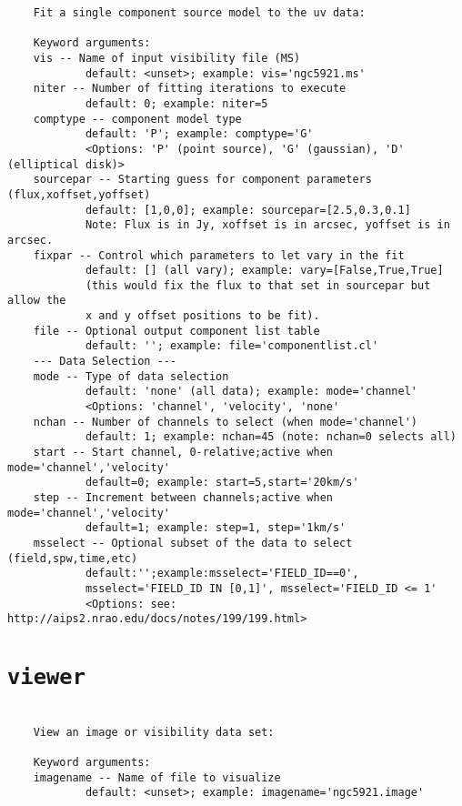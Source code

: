 \small
\begin{verbatim}
    Fit a single component source model to the uv data:
    
    Keyword arguments:
    vis -- Name of input visibility file (MS)
            default: <unset>; example: vis='ngc5921.ms'
    niter -- Number of fitting iterations to execute
            default: 0; example: niter=5
    comptype -- component model type
            default: 'P'; example: comptype='G'
            <Options: 'P' (point source), 'G' (gaussian), 'D' (elliptical disk)>
    sourcepar -- Starting guess for component parameters (flux,xoffset,yoffset)
            default: [1,0,0]; example: sourcepar=[2.5,0.3,0.1]
            Note: Flux is in Jy, xoffset is in arcsec, yoffset is in arcsec.
    fixpar -- Control which parameters to let vary in the fit
            default: [] (all vary); example: vary=[False,True,True]
            (this would fix the flux to that set in sourcepar but allow the
            x and y offset positions to be fit).
    file -- Optional output component list table
            default: ''; example: file='componentlist.cl'
    --- Data Selection ---
    mode -- Type of data selection
            default: 'none' (all data); example: mode='channel'
            <Options: 'channel', 'velocity', 'none'
    nchan -- Number of channels to select (when mode='channel')
            default: 1; example: nchan=45 (note: nchan=0 selects all)
    start -- Start channel, 0-relative;active when mode='channel','velocity'
            default=0; example: start=5,start='20km/s'
    step -- Increment between channels;active when mode='channel','velocity'
            default=1; example: step=1, step='1km/s'
    msselect -- Optional subset of the data to select (field,spw,time,etc)
            default:'';example:msselect='FIELD_ID==0', 
            msselect='FIELD_ID IN [0,1]', msselect='FIELD_ID <= 1'
            <Options: see: http://aips2.nrao.edu/docs/notes/199/199.html>
\end{verbatim}
\normalsize


\section{{\tt viewer}}
\label{section:tasks.viewer}

\small
\begin{verbatim}

    View an image or visibility data set:
    
    Keyword arguments:
    imagename -- Name of file to visualize
            default: <unset>; example: imagename='ngc5921.image'
\end{verbatim}
\normalsize

